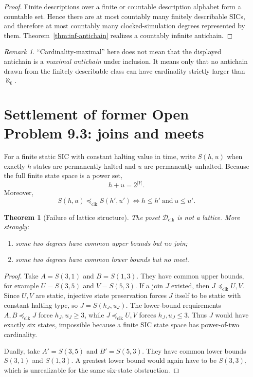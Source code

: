 \documentclass[11pt]{article}
\newtheorem{theorem}[definition]{Theorem}
\theoremstyle{remark}
\newtheorem{remark}[definition]{Remark}
\newcommand{\Dclk}{\mathcal D_{\mathrm{clk}}}
\newcommand{\preclk}{\preceq_{\mathrm{clk}}}
\begin{document}
\begin{proof}
Finite descriptions over a finite or countable description alphabet form a countable set.
Hence there are at most countably many finitely describable SICs, and therefore at most countably
many clocked-simulation degrees represented by them.
Theorem~\ref{thm:inf-antichain} realizes a countably infinite antichain.
\end{proof}

\begin{remark}
``Cardinality-maximal'' here does not mean that the displayed antichain is a
\emph{maximal antichain} under inclusion.
It means only that no antichain drawn from the finitely describable class can have cardinality
strictly larger than \(\aleph_0\).
\end{remark}

\section{Settlement of former Open Problem 9.3: joins and meets}

For a finite static SIC with constant halting value in time, write \(S(h,u)\) when exactly
\(h\) states are permanently halted and \(u\) are permanently unhalted.
Because the full finite state space is a power set,
\[
h+u=2^{|Y|}.
\]
Moreover,
\[
S(h,u)\preclk S(h',u')
\iff
h\le h'\ \text{and}\ u\le u'.
\]

\begin{theorem}[Failure of lattice structure]\label{thm:nonlattice}
The poset \(\Dclk\) is not a lattice.
More strongly:
\begin{enumerate}[label=(\roman*)]
\item some two degrees have common upper bounds but no join;
\item some two degrees have common lower bounds but no meet.
\end{enumerate}
\end{theorem}

\begin{proof}
Take \(A=S(3,1)\) and \(B=S(1,3)\).
They have common upper bounds, for example \(U=S(3,5)\) and \(V=S(5,3)\).
If a join \(J\) existed, then \(J\preclk U,V\).
Since \(U,V\) are static, injective state preservation forces \(J\) itself to be static with constant
halting type, so \(J=S(h_J,u_J)\).
The lower-bound requirements \(A,B\preclk J\) force \(h_J,u_J\ge 3\),
while \(J\preclk U,V\) forces \(h_J,u_J\le 3\).
Thus \(J\) would have exactly six states, impossible because a finite SIC state space has power-of-two
cardinality.

Dually, take \(A'=S(3,5)\) and \(B'=S(5,3)\).
They have common lower bounds \(S(3,1)\) and \(S(1,3)\).
A greatest lower bound would again have to be \(S(3,3)\), which is unrealizable for the same
six-state obstruction.
\end{proof}
\end{document}

